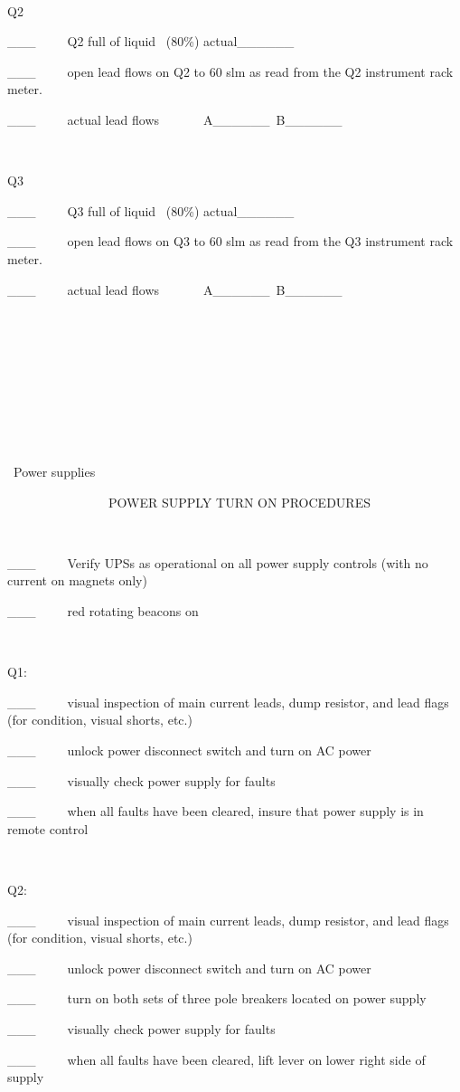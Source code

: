 ~

Q2

\_\_\_~~~~~Q2 full of liquid~ (80\%) actual\_\_\_\_\_\_

\_\_\_~~~~~open lead flows on Q2 to 60 slm as read from the Q2 instrument rack
meter.

\_\_\_~~~~~actual lead flows~~~~~~~A\_\_\_\_\_\_~B\_\_\_\_\_\_

~

Q3

\_\_\_~~~~~Q3 full of liquid~ (80\%) actual\_\_\_\_\_\_

\_\_\_~~~~~open lead flows on Q3 to 60 slm as read from the Q3 instrument rack
meter.

\_\_\_~~~~~actual lead flows~~~~~~~A\_\_\_\_\_\_~B\_\_\_\_\_\_

~

~

~

~

~

~Power supplies

~~~~~~~~~~~~~~~~POWER SUPPLY TURN ON PROCEDURES

~

\_\_\_~~~~~Verify UPSs as operational on all power supply controls (with no
current on magnets only)

\_\_\_~~~~~red rotating beacons on 

~

Q1:~~~~~

\_\_\_~~~~~visual inspection of main current leads, dump resistor, and lead
flags (for condition, visual shorts, etc.)

\_\_\_~~~~~unlock power disconnect switch and turn on AC power

\_\_\_~~~~~visually check power supply for faults

\_\_\_~~~~~when all faults have been cleared, insure that power supply is in
remote control

~

Q2:~~~~~

\_\_\_~~~~~visual inspection of main current leads, dump resistor, and lead
flags (for condition, visual shorts, etc.)

\_\_\_~~~~~unlock power disconnect switch and turn on AC power

\_\_\_~~~~~turn on both sets of three pole breakers located on power supply

\_\_\_~~~~~visually check power supply for faults

\_\_\_~~~~~when all faults have been cleared, lift lever on lower right side
of supply

